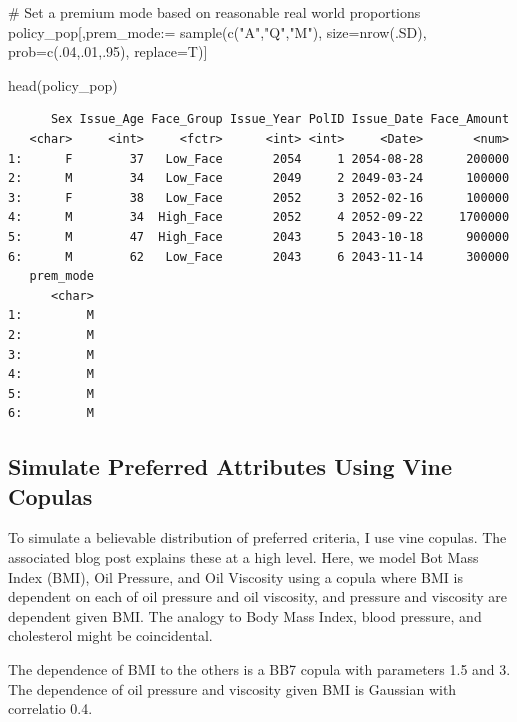 \documentclass[
  letterpaper,
  DIV=11,
  numbers=noendperiod]{scrartcl}
\newenvironment{Shaded}{\begin{snugshade}}{\end{snugshade}}
\newcommand{\AttributeTok}[1]{\textcolor[rgb]{0.40,0.45,0.13}{#1}}
\newcommand{\CommentTok}[1]{\textcolor[rgb]{0.37,0.37,0.37}{#1}}
\newcommand{\DecValTok}[1]{\textcolor[rgb]{0.68,0.00,0.00}{#1}}
\newcommand{\ErrorTok}[1]{\textcolor[rgb]{0.68,0.00,0.00}{#1}}
\newcommand{\FunctionTok}[1]{\textcolor[rgb]{0.28,0.35,0.67}{#1}}
\newcommand{\NormalTok}[1]{\textcolor[rgb]{0.00,0.23,0.31}{#1}}
\newcommand{\SpecialCharTok}[1]{\textcolor[rgb]{0.37,0.37,0.37}{#1}}
\newcommand{\StringTok}[1]{\textcolor[rgb]{0.13,0.47,0.30}{#1}}
\begin{document}
\begin{Shaded}
\begin{Highlighting}[]
\CommentTok{\# Set a premium mode based on reasonable real world proportions}
\NormalTok{policy\_pop[,prem\_mode}\SpecialCharTok{:}\ErrorTok{=} \FunctionTok{sample}\NormalTok{(}\FunctionTok{c}\NormalTok{(}\StringTok{"A"}\NormalTok{,}\StringTok{"Q"}\NormalTok{,}\StringTok{"M"}\NormalTok{),}
                               \AttributeTok{size=}\FunctionTok{nrow}\NormalTok{(.SD),}
                               \AttributeTok{prob=}\FunctionTok{c}\NormalTok{(.}\DecValTok{04}\NormalTok{,.}\DecValTok{01}\NormalTok{,.}\DecValTok{95}\NormalTok{),}
                               \AttributeTok{replace=}\NormalTok{T)]}

\FunctionTok{head}\NormalTok{(policy\_pop)}
\end{Highlighting}
\end{Shaded}

\begin{verbatim}
      Sex Issue_Age Face_Group Issue_Year PolID Issue_Date Face_Amount
   <char>     <int>     <fctr>      <int> <int>     <Date>       <num>
1:      F        37   Low_Face       2054     1 2054-08-28      200000
2:      M        34   Low_Face       2049     2 2049-03-24      100000
3:      F        38   Low_Face       2052     3 2052-02-16      100000
4:      M        34  High_Face       2052     4 2052-09-22     1700000
5:      M        47  High_Face       2043     5 2043-10-18      900000
6:      M        62   Low_Face       2043     6 2043-11-14      300000
   prem_mode
      <char>
1:         M
2:         M
3:         M
4:         M
5:         M
6:         M
\end{verbatim}

\hypertarget{simulate-preferred-attributes-using-vine-copulas}{%
\subsection{Simulate Preferred Attributes Using Vine
Copulas}\label{simulate-preferred-attributes-using-vine-copulas}}

To simulate a believable distribution of preferred criteria, I use vine
copulas. The associated blog post explains these at a high level. Here,
we model Bot Mass Index (BMI), Oil Pressure, and Oil Viscosity using a
copula where BMI is dependent on each of oil pressure and oil viscosity,
and pressure and viscosity are dependent given BMI. The analogy to Body
Mass Index, blood pressure, and cholesterol might be coincidental.

The dependence of BMI to the others is a BB7 copula with parameters 1.5
and 3. The dependence of oil pressure and viscosity given BMI is
Gaussian with correlatio 0.4.
\end{document}
